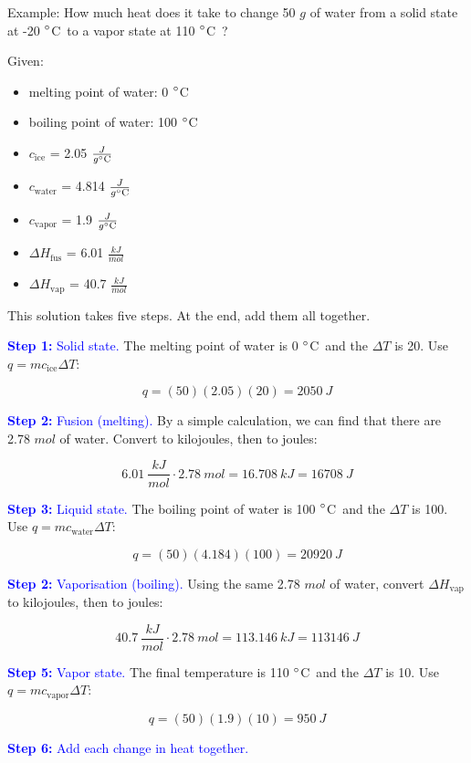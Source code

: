 \documentclass[a4paper, 12pt]{article}
\newcommand{\degC}{$\degree$C \,}
\newcommand{\cunits}{$\frac{J}{g \degree \text{C}}$}
\begin{document}
Example: How much heat does it take to change 50 $g$ of water from a solid state at -20 \degC to a vapor state at 110 \degC?

Given:

\begin{itemize}[leftmargin=*, nosep]
	\item melting point of water: 0 \degC
	\item boiling point of water: 100 \degC
	\item $c_\text{ice}$ = 2.05 \cunits
	\item $c_\text{water}$ = 4.814 \cunits
	\item $c_\text{vapor}$ = 1.9 \cunits
	\item $\Delta H_\text{fus}$ = 6.01 $\frac{kJ}{mol}$
	\item $\Delta H_\text{vap}$ = 40.7 $\frac{kJ}{mol}$
\end{itemize}

This solution takes five steps. At the end, add them all together.

\textcolor{blue}{\textbf{Step 1:} Solid state.} The melting point of water is 0 \degC and the $\Delta T$ is 20. Use \(q = mc_\text{ice}\Delta T\):

\[q = (50)(2.05)(20) = 2050 \: J\]

\textcolor{blue}{\textbf{Step 2:} Fusion (melting).} By a simple calculation, we can find that there are 2.78 $mol$ of water. Convert to kilojoules, then to joules:

\[6.01 \: \frac{kJ}{mol} \cdot 2.78 \: mol = 16.708 \: kJ = 16708 \: J\]

\textcolor{blue}{\textbf{Step 3:} Liquid state.} The boiling point of water is 100 \degC and the $\Delta T$ is 100. Use \(q = mc_\text{water}\Delta T\):

\[q = (50)(4.184)(100) = 20920 \: J\]

\textcolor{blue}{\textbf{Step 2:} Vaporisation (boiling).} Using the same 2.78 $mol$ of water, convert $\Delta H_\text{vap}$ to kilojoules, then to joules:

\[40.7 \: \frac{kJ}{mol} \cdot 2.78 \: mol = 113.146 \: kJ = 113146 \: J\]

\textcolor{blue}{\textbf{Step 5:} Vapor state.} The final temperature is 110 \degC and the $\Delta T$ is 10. Use \(q = mc_\text{vapor}\Delta T\):

\[q = (50)(1.9)(10) = 950 \: J\]

\textcolor{blue}{\textbf{Step 6:} Add each change in heat together.}
\end{document}
